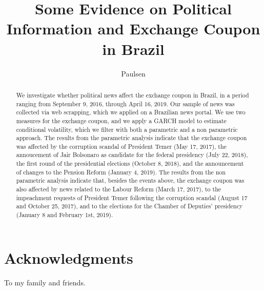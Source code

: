 \documentclass[cic,tc, english]{iiufrgs}
\title{Some Evidence on Political Information and Exchange Coupon in Brazil}
\author{Paulsen}{Bernardo Hillesheim}
\begin{document}
\maketitle


\chapter*{Acknowledgments}

To my family and friends. %



\begin{abstract}
    We investigate whether political news affect the exchange coupon in Brazil, in a period ranging from September 9, 2016, through April 16, 2019. Our sample of news was collected via web scrapping, which we applied on a Brazilian news portal. We use two measures for the exchange coupon, and we apply a GARCH model to estimate conditional volatility, which we filter with both a parametric and a non parametric approach. The results from the parametric analysis indicate that the exchange coupon was affected by the corruption scandal of President Temer (May 17, 2017), the annoucement of Jair Bolsonaro as candidate for the federal presidency (July 22, 2018), the first round of the presidential elections (October 8, 2018), and the announcement of changes to the Pension Reform (January 4, 2019). The results from the non parametric analysis indicate that, besides the events above, the exchange coupon was also affected by news related to the Labour Reform (March 17, 2017), to the impeachment requests of President Temer following the corruption scandal (August 17 and October 25, 2017), and to the elections for the Chamber of Deputies' presidency (January 8 and February 1st, 2019).
\end{abstract}
\end{document}
